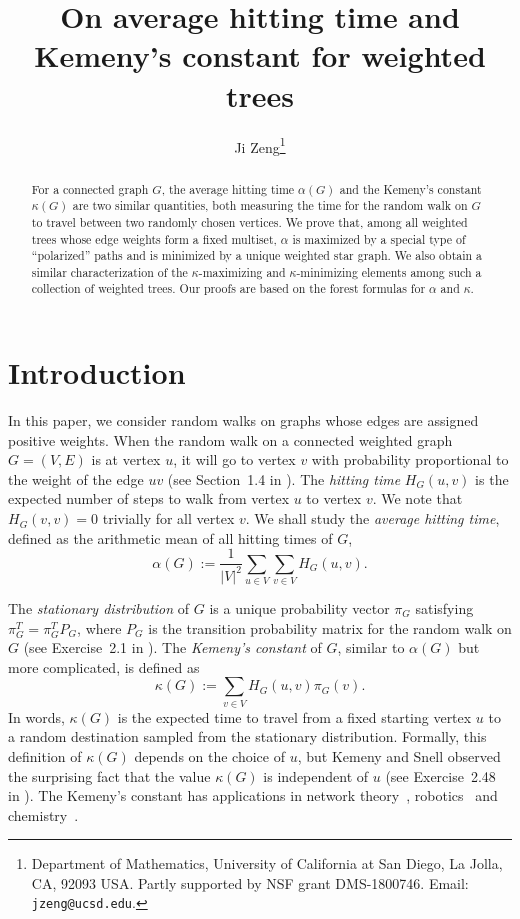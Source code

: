\documentclass[11pt]{article}
\title{On average hitting time and Kemeny's constant for weighted trees}
\author{Ji Zeng\thanks{Department of Mathematics, University of California at San Diego, La Jolla, CA, 92093 USA. Partly supported by NSF grant DMS-1800746. Email: {\tt jzeng@ucsd.edu}.} }
\date{}
\theoremstyle{definition}
\begin{document}
\maketitle

\begin{abstract}
For a connected graph $G$, the average hitting time $\alpha(G)$ and the Kemeny's constant $\kappa(G)$ are two similar quantities, both measuring the time for the random walk on $G$ to travel between two randomly chosen vertices. We prove that, among all weighted trees whose edge weights form a fixed multiset, $\alpha$ is maximized by a special type of ``polarized'' paths and is minimized by a unique weighted star graph. We also obtain a similar characterization of the $\kappa$-maximizing and $\kappa$-minimizing elements among such a collection of weighted trees. Our proofs are based on the forest formulas for $\alpha$ and $\kappa$.
\end{abstract}

\section{Introduction}\label{section_intro}

In this paper, we consider random walks on graphs whose edges are assigned positive weights. When the random walk on a connected weighted graph $G=(V,E)$ is at vertex $u$, it will go to vertex $v$ with probability proportional to the weight of the edge $uv$ (see Section~1.4 in \cite{lyons2017probability}). The \emph{hitting time} $H_G(u,v)$ is the expected number of steps to walk from vertex $u$ to vertex $v$. We note that $H_G(v,v) = 0$ trivially for all vertex $v$. We shall study the \emph{average hitting time}, defined as the arithmetic mean of all hitting times of $G$,
    \[\alpha(G):=\frac{1}{|V|^2}\sum_{u\in V}\sum_{v\in V} H_G(u,v).\]

The \emph{stationary distribution} of $G$ is a unique probability vector $\pi_G$ satisfying $\pi_G^T=\pi_G^T P_G$, where $P_G$ is the transition probability matrix for the random walk on $G$ (see Exercise~2.1 in \cite{lyons2017probability}). The \emph{Kemeny's constant} of $G$, similar to $\alpha(G)$ but more complicated, is defined as
    \[\kappa(G):=\sum_{v\in V}H_G(u,v)\pi_G(v).\]
In words, $\kappa(G)$ is the expected time to travel from a fixed starting vertex $u$ to a random destination sampled from the stationary distribution. Formally, this definition of $\kappa(G)$ depends on the choice of $u$, but Kemeny and Snell \cite{kemeny} observed the surprising fact that the value $\kappa(G)$ is independent of $u$ (see Exercise~2.48 in \cite{lyons2017probability}). The Kemeny's constant has applications in network theory~\cite{levene2002kemeny}, robotics~\cite{patel2015robotic} and chemistry~\cite{li2019multiplicative}.
\end{document}
